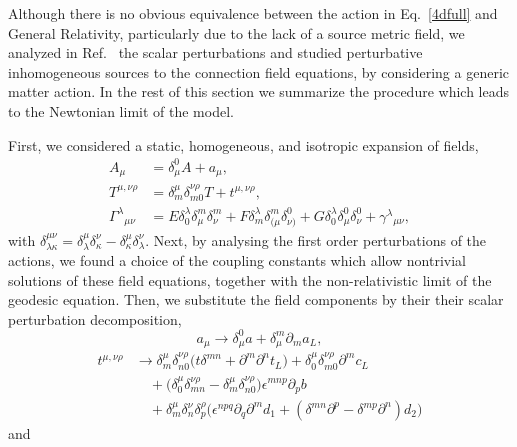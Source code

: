 \documentclass[aps,prd,12pt,twocolumn,superscriptaddress,showpacs,showkeys,reprint,longbibliography]{revtex4-1}
\renewcommand{\(}{\left(}
\renewcommand{\)}{\right)}
\renewcommand{\[}{\left[}
\renewcommand{\]}{\right]}
\begin{document}
Although there is no obvious equivalence between the action in Eq.~\eqref{4dfull} and General Relativity, particularly due to the lack of a source metric field, we analyzed in Ref.~\cite{Skirzewski:2014eta} the scalar perturbations and studied perturbative inhomogeneous sources to the connection field equations, by considering a generic matter action. In the rest of this section we summarize the procedure which leads to the Newtonian limit of the model.

First, we considered a static, homogeneous, and isotropic expansion of fields,
\begin{align}
  A_\mu &= \delta_\mu^0 A + a_\mu,\\
  T^{\mu,\nu\rho} &= \delta^{\mu}_m\delta^{\nu\rho}_{m0}T + t^{\mu,\nu\rho},\\
  \Gamma^\lambda{}_{\mu\nu} &= E \delta^\lambda_0 \delta^m_\mu \delta^m_\nu + F \delta^\lambda_m \delta^m_{(\mu}\delta^0_{\nu)} + G\delta^\lambda_0 \delta^0_{\mu}\delta^0_{\nu} + \gamma^\lambda{}_{\mu\nu},
  \label{GammaExp}
\end{align}
with $\delta^{\mu\nu}_{\lambda\kappa}=\delta^{\mu}_{\lambda}\delta^{\nu}_{\kappa}-\delta^{\mu}_{\kappa}\delta^{\nu}_{\lambda}$. Next, by analysing the first order perturbations of the actions, we found a choice of the coupling constants which allow nontrivial solutions of these field equations, together with the non-relativistic limit of the geodesic equation. Then, we substitute the field components by their their scalar perturbation decomposition,
\begin{equation}
  a_\mu \to \delta_\mu^0 a+\delta_\mu^m \partial_{m}a_L,
\end{equation}
\begin{equation}
  \begin{split}
    t^{\mu,\nu\rho} &\to \delta^{\mu}_m\delta^{\nu\rho}_{n0} \Big(t \delta^{m n} + \partial^m \partial^n t_L \Big)
    +\delta^{\mu}_0 \delta^{\nu\rho}_{m0} \partial^m c_L
    \\
    & \quad + \Big(\delta^{\mu}_0\delta^{\nu\rho}_{mn}-\delta^{\mu}_m\delta^{\nu\rho}_{n0}\Big)\epsilon^{m n p} \partial_{p} b
    \\
    & \quad +\delta^{\mu}_m \delta^{\nu}_{n} \delta^{\rho}_{p} \Big(\epsilon^{n p q}\partial_q \partial^m d_1 +  (\delta^{m n} \partial^p - \delta^{m p} \partial^n)d_2\Big)
  \end{split}
\end{equation}
and
\end{document}
